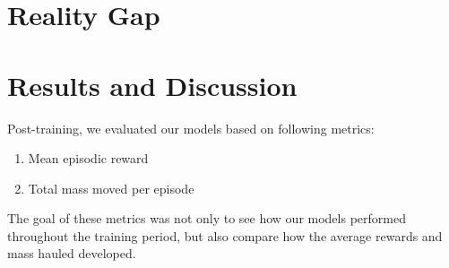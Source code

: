 \documentclass[conference]{IEEEtran}
\begin{document}
\section{Reality Gap}



\section{Results and Discussion}
Post-training, we evaluated our models based on following metrics:

\begin{enumerate}
	\item Mean episodic reward
	\item Total mass moved per episode
\end{enumerate}

The goal of these metrics was not only to see how our models performed throughout the training period, but also compare how the average rewards and mass hauled developed.
\end{document}

